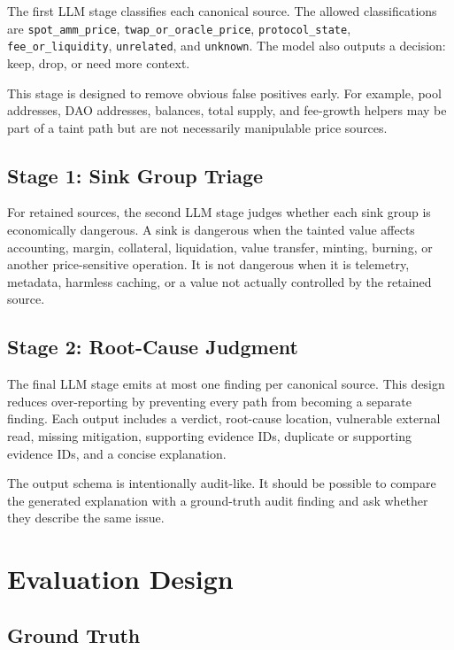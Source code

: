 The first LLM stage classifies each canonical source. The allowed
classifications are \texttt{spot\_amm\_price},
\texttt{twap\_or\_oracle\_price}, \texttt{protocol\_state},
\texttt{fee\_or\_liquidity}, \texttt{unrelated}, and \texttt{unknown}. The
model also outputs a decision: keep, drop, or need more context.

This stage is designed to remove obvious false positives early. For example,
pool addresses, DAO addresses, balances, total supply, and fee-growth helpers
may be part of a taint path but are not necessarily manipulable price sources.

\subsection{Stage 1: Sink Group Triage}

For retained sources, the second LLM stage judges whether each sink group is
economically dangerous. A sink is dangerous when the tainted value affects
accounting, margin, collateral, liquidation, value transfer, minting, burning,
or another price-sensitive operation. It is not dangerous when it is telemetry,
metadata, harmless caching, or a value not actually controlled by the retained
source.

\subsection{Stage 2: Root-Cause Judgment}

The final LLM stage emits at most one finding per canonical source. This design
reduces over-reporting by preventing every path from becoming a separate
finding. Each output includes a verdict, root-cause location, vulnerable
external read, missing mitigation, supporting evidence IDs, duplicate or
supporting evidence IDs, and a concise explanation.

The output schema is intentionally audit-like. It should be possible to compare
the generated explanation with a ground-truth audit finding and ask whether
they describe the same issue.

\section{Evaluation Design}

\subsection{Ground Truth}

